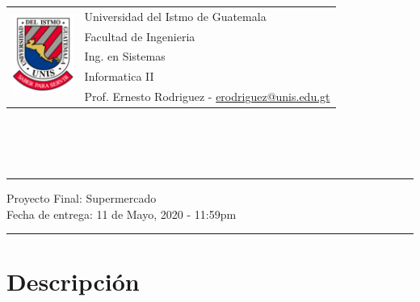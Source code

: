 \documentclass{article}
\newcommand{\horrule}[1]{\rule{\linewidth}{#1}}
\begin{document}
\begin{tabular}{l l}
\multirow{5}{*}{\includegraphics[width=2cm]{../recursos/logo.png}} & Universidad del Istmo de Guatemala \\
 & Facultad de Ingenieria \\
 & Ing. en Sistemas \\
 & Informatica II \\
 & Prof. Ernesto Rodriguez - \href{mailto:erodriguez@unis.edu.gt}{erodriguez@unis.edu.gt} \\
\end{tabular}
\\\\\\

\begin{center}
        \horrule{0.5pt}
        \huge{Proyecto Final: Supermercado} \\
        \large{Fecha de entrega: 11 de Mayo, 2020 - 11:59pm} \\
        \horrule{1pt}
\end{center}

\section*{Descripci\'on}
\end{document}
